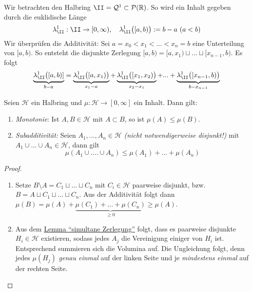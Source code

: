 \begin{example}
Wir betrachten den Halbring $\II = \mathcal{Q}^1 \subset \mathcal{P}(\R)$. So wird ein Inhalt gegeben durch die euklidische Länge
\begin{align} \label{I23}
\lambda^1_\II : \II \to [0, \infty), \quad \lambda^1_\II \big([a,b)\big) := b-a \ (a<b)
\end{align}
Wir überprüfen die Additivität: Sei $a = x_0 < x_1 < ... < x_{n} = b$ eine Unterteilung von $[a,b)$. So entsteht die disjunkte Zerlegung $[a,b) = [a,x_1) \sqcup ... \sqcup [x_{n-1},b)$. Es folgt 
\begin{equation*}
\underbrace{\lambda^1_\II \big([a,b)]}_{b-a} = \underbrace{\lambda^1_\II \big( [a,x_1)\big)}_{x_1-a} + \underbrace{\lambda^1_\II \big([x_1,x_2)\big)}_{x_2 -x_1} + ... + \underbrace{\lambda^1_\II \big( [x_{n-1},b ) \big)}_{b-x_{n-1}}
\end{equation*}
\end{example}
\begin{lemma}
\begin{mdframed}
Seien $\mathcal{H}$ ein Halbring und $\mu:\mathcal{H} \longrightarrow [0,\infty]$ ein Inhalt. Dann gilt:
\begin{enumerate}[(\roman*),topsep=5pt, itemsep = 0 pt]
	\item \emph{Monotonie}: Ist $A, B \in \mathcal{H}$ mit $A \subset B$, so ist $\mu (A) \leq \mu (B)$.
	\item \emph{Subadditivität:} Seien $A_1, ..., A_n \in \mathcal{H}$ \emph{(nicht notwendigerweise disjunkt!)} mit $A_1 \cup ... \cup A_n \in \mathcal{H}$, dann gilt
	\begin{equation*}
	\mu(A_1 \cup .... \cup A_n) \leq \mu (A_1) + ... + \mu (A_n)
	\end{equation*}
\end{enumerate}
\end{mdframed}
\begin{proof} \
\begin{enumerate}[(\roman*),topsep=5pt, itemsep = 0 pt]
\item Setze $B \setminus A = C_1 \sqcup ... \sqcup C_n$ mit $C_i \in \mathcal{H}$ paarweise disjunkt, bzw. $B= A \sqcup C_1 \sqcup ... \sqcup C_n$. Aus der Additivität folgt dann $\mu(B) = \mu (A) + \underbrace{\mu(C_1) + ... + \mu (C_n)}_{\geq 0} \geq \mu (A)$.
\item Aus dem \hyperref[lemmaA]{Lemma ``simultane Zerlegung''} folgt, dass es paarweise disjunkte $H_i \in \mathcal{H}$ existieren, sodass jedes $A_j$ die Vereinigung einiger von $H_i$ ist. Entsprechend summieren sich die Volumina auf. Die Ungleichung folgt, denn jedes $\mu(H_j)$ \emph{genau einmal} auf der linken Seite und je \emph{mindestens einmal} auf der rechten Seite.
\end{enumerate}
\end{proof}
\end{lemma}

